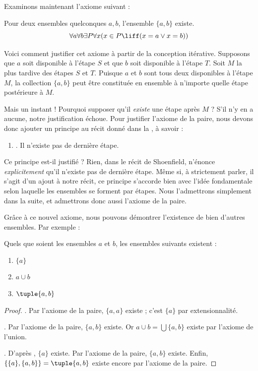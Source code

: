 \documentclass[../../../include/open-logic-section]{subfiles}
\begin{document}

Examinons maintenant l'axiome suivant :

\begin{axiom}[Paire]
Pour deux ensembles quelconques $a, b$, l'ensemble $\{a, b\}$ existe.
\[
	\forall a \forall b \exists P \forall x (x \in P \liff (x = a \lor x = b))
\]
\end{axiom}

Voici comment justifier cet axiome à partir de la conception
itérative. Supposons que $a$ soit disponible à l'étape $S$ et que
$b$ soit disponible à l'étape $T$. Soit $M$ la plus tardive des étapes
$S$ et $T$. Puisque $a$ et $b$ sont tous deux disponibles à l'étape
$M$, la collection $\{a,b\}$ peut être constituée en ensemble à
n'importe quelle étape postérieure à $M$.

Mais un instant !{} Pourquoi supposer qu'il \emph{existe} une étape
après $M$ ? S'il n'y en a aucune, notre justification échoue. Pour
justifier l'axiome de la paire, nous devons donc ajouter un principe
au récit donné dans la , à savoir :
\begin{enumerate}
	\item[] \stagessucc. Il n'existe pas de dernière étape.
\end{enumerate}
Ce principe est-il justifié ? Rien, dans le récit de Shoenfield,
n'énonce \emph{explicitement} qu'il n'existe pas de dernière étape.
Même si, à strictement parler, il s'agit d'un ajout à notre récit,
ce principe s'accorde bien avec l'idée fondamentale selon laquelle
les ensembles se forment par étapes. Nous l'admettrons simplement
dans la suite, et admettrons donc aussi l'axiome de la paire.

Grâce à ce nouvel axiome, nous pouvons démontrer l'existence de bien
d'autres ensembles. Par exemple :

\begin{prop}
Quels que soient les ensembles $a$ et $b$, les ensembles suivants existent :
	\begin{enumerate}
		\item{} $\{a\}$
		\item{} $a \cup b$
		\item{} $\tuple{a, b}$
	\end{enumerate}
\end{prop}

\begin{proof}
. Par l'axiome de la paire, $\{a, a\}$ existe ;
c'est $\{a\}$ par extensionnalité.

. Par l'axiome de la paire, $\{a, b\}$ existe.
Or $a \cup b = \bigcup \{a, b\}$ existe par l'axiome de l'union.

. D'après , $\{a\}$ existe. Par
l'axiome de la paire, $\{a, b\}$ existe. Enfin,
$\{\{a\}, \{a, b\}\} = \tuple{a, b}$ existe encore par l'axiome de la
paire.
\end{proof}
\end{document}
